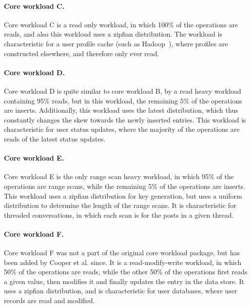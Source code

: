 \documentclass[11pt]{report} %
\begin{document}
\paragraph{Core workload C.}
Core workload C is a read only workload, in which 100\% of the operations are reads, and also this workload uses a zipfian distribution. The workload is characteristic for a user profile cache (such as Hadoop~\cite{hbase}), where profiles are constructed elsewhere, and therefore only ever read.

\paragraph{Core workload D.}
Core workload D is quite similar to core workload B, by a read heavy workload containing 95\% reads, but in this workload, the remaining 5\% of the operations are inserts. Additionally, this workload uses the latest distribution, which thus constantly changes the skew towards the newly inserted entries. This workload is characteristic for user status updates, where the majority of the operations are reads of the latest status updates. 

\paragraph{Core workload E.}
Core workload E is the only range scan heavy workload, in which 95\% of the operations are range scans, while the remaining 5\% of the operations are inserts. This workload uses a zipfian distribution for key generation, but uses a uniform distribution to determine the length of the range scans. It is characteristic for threaded conversations, in which each scan is for the posts in a given thread.

\paragraph{Core workload F.}
Core workload F was not a part of the original core workload package, but has been added by Cooper et al. since. It is a read-modify-write workload, in which 50\% of the operations are reads, while the other 50\% of the operations first reads a given value, then modifies it and finally updates the entry in the data store. It uses a zipfian distribution, and is characteristic for user databases, where user records are read and modified.
\end{document}
